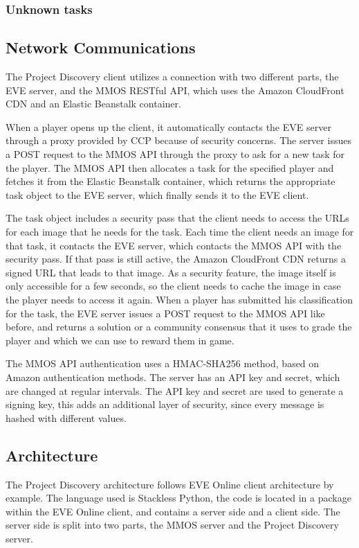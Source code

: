 	\subsubsection{Unknown tasks}

\subsection{Network Communications}
	The Project Discovery client utilizes a connection with two different parts, the EVE server, and the MMOS RESTful API, which uses the Amazon CloudFront CDN and an Elastic Beanstalk container.

	When a player opens up the client, it automatically contacts the EVE server through a proxy provided by CCP because of security concerns. The server issues a POST request to the MMOS API through the proxy to ask for a new task for the player. The MMOS API then allocates a task for the specified player and fetches it from the Elastic Beanstalk container, which returns the appropriate task object to the EVE server, which finally sends it to the EVE client. 

	The task object includes a security pass that the client needs to access the URLs for each image that he needs for the task. Each time the client needs an image for that task, it contacts the EVE server, which contacts the MMOS API with the security pass. If that pass is still active, the Amazon CloudFront CDN returns a signed URL that leads to that image. As a security feature, the image itself is only accessible for a few seconds, so the client needs to cache the image in case the player needs to access it again. When a player has submitted his classification for the task, the EVE server issues a POST request to the MMOS API like before, and returns a solution or a community consensus that it uses to grade the player and which we can use to reward them in game.

	The MMOS API authentication uses a HMAC-SHA256 method, based on Amazon authentication methods. The server has an API key and secret, which are changed at regular intervals. The API key and secret are used to generate a signing key, this adds an additional layer of security, since every message is hashed with different values.


\subsection{Architecture}
	The Project Discovery architecture follows EVE Online client architecture by example. The language used is Stackless Python, the code is located in a package within the EVE Online client, and contains a server side and a client side. The server side is split into two parts, the MMOS server and the Project Discovery server. 

